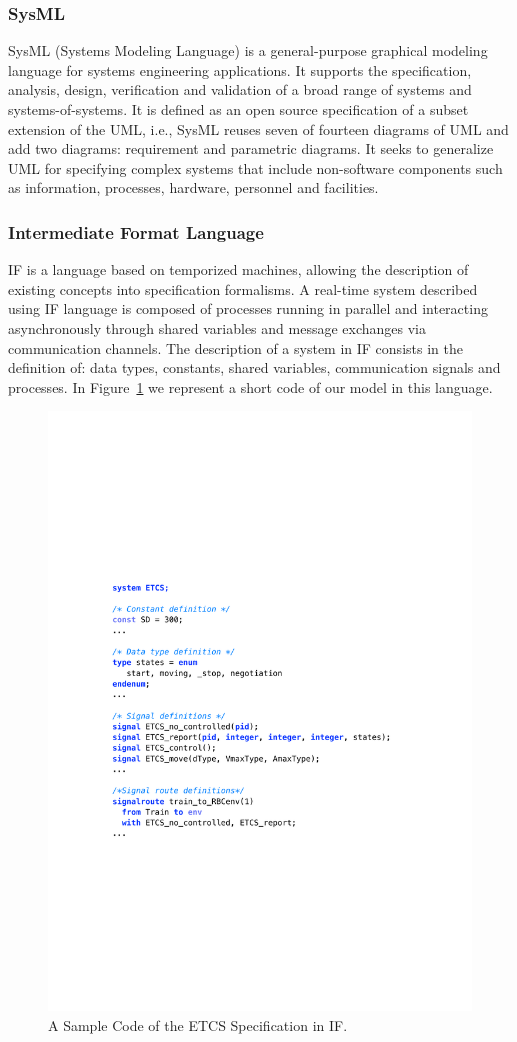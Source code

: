 \documentclass{template/openetcs_article}
\begin{document}
\subsubsection{SysML}

SysML (Systems Modeling Language) is a general-purpose graphical modeling language for systems engineering applications. It supports the specification, analysis, design, verification and validation of a broad range of systems and systems-of-systems. It is defined as an open source specification of a subset extension of the UML, i.e., SysML reuses seven of fourteen diagrams of UML and add two diagrams: requirement and parametric diagrams. It seeks to generalize UML for specifying complex systems that include non-software components such as information, processes, hardware, personnel and facilities.


\subsubsection{Intermediate Format Language}

IF is a language based on temporized machines, allowing the description of existing concepts into specification formalisms.  A real-time system described using IF language is composed of processes running in parallel and interacting asynchronously through shared variables and message exchanges via communication channels. The description of a system in IF consists in the definition of: data types, constants, shared variables, communication signals and processes. In Figure~\ref{fig:if:specification} we represent a short code of our model in this language.

\begin{figure}[!htbp]
\centering
  \includegraphics[width=.6\textwidth]{figures/IF-spec.pdf}
  \caption{A Sample Code of the ETCS Specification in IF.}
  \label{fig:if:specification}
\end{figure}
\end{document}
